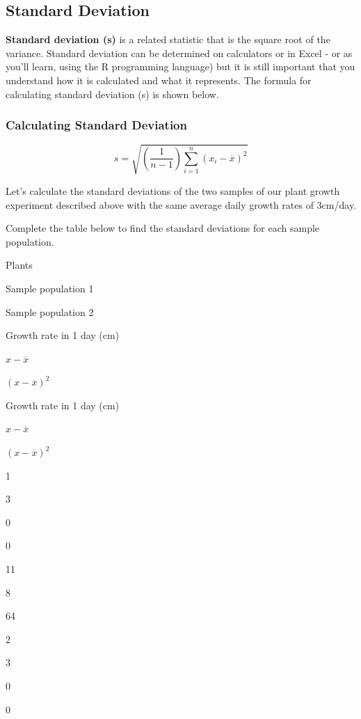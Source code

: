 \documentclass[
]{book}
\begin{document}
\hypertarget{standard-deviation}{%
\subsection*{Standard Deviation}\label{standard-deviation}}

\textbf{Standard deviation (s)} is a related statistic that is the square root of the variance. Standard deviation can be determined on calculators or in Excel - or as you'll learn, using the R programming language) but it is still important that you understand how it is calculated and what it represents. The formula for calculating standard deviation (s) is shown below.

\hypertarget{calculating-standard-deviation}{%
\subsubsection*{Calculating Standard Deviation}\label{calculating-standard-deviation}}

\[s =\sqrt{(\frac{1}{n-1})\sum_{i=1}^{n}(x_{i}-\overline{x})^{2}}\]

Let's calculate the standard deviations of the two samples of our plant growth experiment described above with the same average daily growth rates of 3cm/day.

Complete the table below to find the standard deviations for each sample population.

Plants

Sample population 1

Sample population 2

Growth rate in 1 day (cm)

\(x-\overline{x}\)

\((x-\overline{x})^{2}\)

Growth rate in 1 day (cm)

\(x-\overline{x}\)

\((x-\overline{x})^{2}\)

1

3

0

0

11

8

64

2

3

0

0
\end{document}
